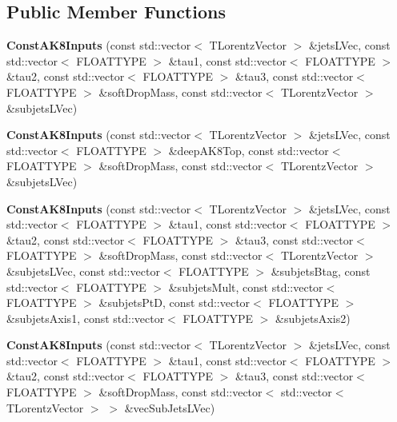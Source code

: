 \subsection*{Public Member Functions}
\begin{DoxyCompactItemize}
\item 
\hypertarget{classttUtility_1_1ConstAK8Inputs_aaae2a8597035f10337b5454e34af790c}{{\bfseries Const\-A\-K8\-Inputs} (const std\-::vector$<$ T\-Lorentz\-Vector $>$ \&jets\-L\-Vec, const std\-::vector$<$ F\-L\-O\-A\-T\-T\-Y\-P\-E $>$ \&tau1, const std\-::vector$<$ F\-L\-O\-A\-T\-T\-Y\-P\-E $>$ \&tau2, const std\-::vector$<$ F\-L\-O\-A\-T\-T\-Y\-P\-E $>$ \&tau3, const std\-::vector$<$ F\-L\-O\-A\-T\-T\-Y\-P\-E $>$ \&soft\-Drop\-Mass, const std\-::vector$<$ T\-Lorentz\-Vector $>$ \&subjets\-L\-Vec)}\label{classttUtility_1_1ConstAK8Inputs_aaae2a8597035f10337b5454e34af790c}

\item 
\hypertarget{classttUtility_1_1ConstAK8Inputs_ac3ed4dfcce57f47f3a62882659561916}{{\bfseries Const\-A\-K8\-Inputs} (const std\-::vector$<$ T\-Lorentz\-Vector $>$ \&jets\-L\-Vec, const std\-::vector$<$ F\-L\-O\-A\-T\-T\-Y\-P\-E $>$ \&deep\-A\-K8\-Top, const std\-::vector$<$ F\-L\-O\-A\-T\-T\-Y\-P\-E $>$ \&soft\-Drop\-Mass, const std\-::vector$<$ T\-Lorentz\-Vector $>$ \&subjets\-L\-Vec)}\label{classttUtility_1_1ConstAK8Inputs_ac3ed4dfcce57f47f3a62882659561916}

\item 
\hypertarget{classttUtility_1_1ConstAK8Inputs_a4f18f62b24822d170a0cebad8c70eb2b}{{\bfseries Const\-A\-K8\-Inputs} (const std\-::vector$<$ T\-Lorentz\-Vector $>$ \&jets\-L\-Vec, const std\-::vector$<$ F\-L\-O\-A\-T\-T\-Y\-P\-E $>$ \&tau1, const std\-::vector$<$ F\-L\-O\-A\-T\-T\-Y\-P\-E $>$ \&tau2, const std\-::vector$<$ F\-L\-O\-A\-T\-T\-Y\-P\-E $>$ \&tau3, const std\-::vector$<$ F\-L\-O\-A\-T\-T\-Y\-P\-E $>$ \&soft\-Drop\-Mass, const std\-::vector$<$ T\-Lorentz\-Vector $>$ \&subjets\-L\-Vec, const std\-::vector$<$ F\-L\-O\-A\-T\-T\-Y\-P\-E $>$ \&subjets\-Btag, const std\-::vector$<$ F\-L\-O\-A\-T\-T\-Y\-P\-E $>$ \&subjets\-Mult, const std\-::vector$<$ F\-L\-O\-A\-T\-T\-Y\-P\-E $>$ \&subjets\-Pt\-D, const std\-::vector$<$ F\-L\-O\-A\-T\-T\-Y\-P\-E $>$ \&subjets\-Axis1, const std\-::vector$<$ F\-L\-O\-A\-T\-T\-Y\-P\-E $>$ \&subjets\-Axis2)}\label{classttUtility_1_1ConstAK8Inputs_a4f18f62b24822d170a0cebad8c70eb2b}

\item 
\hypertarget{classttUtility_1_1ConstAK8Inputs_af9b5c0cf9a84a55923c86ff27ec8ce1d}{{\bfseries Const\-A\-K8\-Inputs} (const std\-::vector$<$ T\-Lorentz\-Vector $>$ \&jets\-L\-Vec, const std\-::vector$<$ F\-L\-O\-A\-T\-T\-Y\-P\-E $>$ \&tau1, const std\-::vector$<$ F\-L\-O\-A\-T\-T\-Y\-P\-E $>$ \&tau2, const std\-::vector$<$ F\-L\-O\-A\-T\-T\-Y\-P\-E $>$ \&tau3, const std\-::vector$<$ F\-L\-O\-A\-T\-T\-Y\-P\-E $>$ \&soft\-Drop\-Mass, const std\-::vector$<$ std\-::vector$<$ T\-Lorentz\-Vector $>$ $>$ \&vec\-Sub\-Jets\-L\-Vec)}\label{classttUtility_1_1ConstAK8Inputs_af9b5c0cf9a84a55923c86ff27ec8ce1d}


\end{DoxyCompactItemize}

